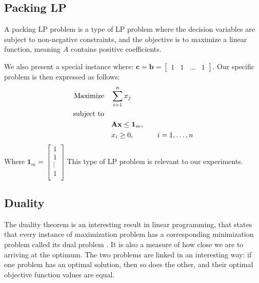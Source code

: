 \subsection{Packing LP}
A packing LP problem is a type of LP problem where the decision variables are subject to non-negative constraints, and the objective is to maximize a linear function, meaning $A$ contains positive coefficients.

We also present a special instance where:
\( \mathbf{c}  = \mathbf{b} =  \begin{bmatrix}
    1 & 1 & \dots & 1
\end{bmatrix} \).
Our specific problem is then expressed as follows:
\begin{align}
    \text{Maximize} \quad   & \sum_{i=1}^{n} x_j \notag                                                             \\
    \text{subject to} \quad & \notag                                                                                \\
                            & \mathbf{A} \mathbf{x} \leq \mathbf{1}_m, \quad      \notag                                    \\
                            & x_i \geq 0, \quad   \notag                             & i = 1, \ldots, n \label{PLP_Problem}
\end{align}
Where $\mathbf{1}_m = \begin{bmatrix}
        1      \\
        1      \\
        \vdots \\
        1      \\
    \end{bmatrix}$
This type of LP problem is relevant to our experiments.

\subsection{Duality}\label{duality}

The duality theorem is an interesting result in linear programming, that states that every instance of maximization problem has a corresponding minimization problem called its dual problem \parencite{chvatal1983linear}. It is also a measure of how close we are to arriving at the optimum. The two problems are linked in an interesting way: if one problem has an optimal solution, then so does the other, and their optimal objective function values are equal.

